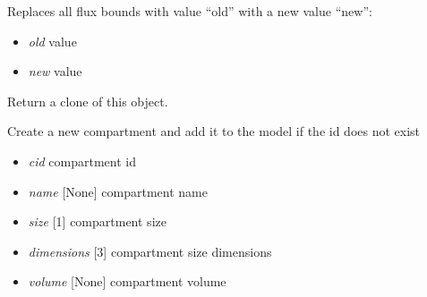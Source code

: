 \documentclass[a4paper,11pt,english]{sphinxmanual}
\begin{document}
\begin{fulllineitems}
\begin{fulllineitems}
\begin{itemize}
\end{itemize}

\end{fulllineitems}


\begin{fulllineitems}
\label{modules_doc:cbmpy.CBModel.Model.changeAllFluxBoundsWithValue}
Replaces all flux bounds with value ``old'' with a new value ``new'':
\begin{itemize}
\item {} 
\emph{old} value

\item {} 
\emph{new} value

\end{itemize}

\end{fulllineitems}


\begin{fulllineitems}
\label{modules_doc:cbmpy.CBModel.Model.clone}
Return a clone of this object.

\end{fulllineitems}


\begin{fulllineitems}
\label{modules_doc:cbmpy.CBModel.Model.createCompartment}
Create a new compartment and add it to the model if the id does not exist
\begin{itemize}
\item {} 
\emph{cid} compartment id

\item {} 
\emph{name} {[}None{]} compartment name

\item {} 
\emph{size} {[}1{]} compartment size

\item {} 
\emph{dimensions} {[}3{]} compartment size dimensions

\item {} 
\emph{volume} {[}None{]} compartment volume


\end{itemize}
\end{fulllineitems}
\end{fulllineitems}
\end{document}
